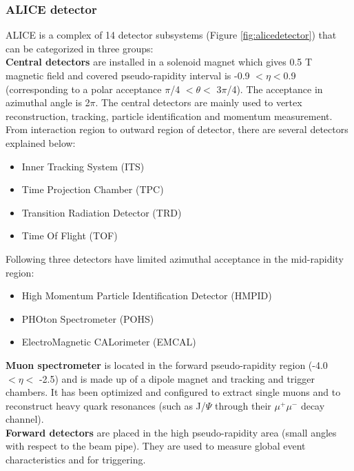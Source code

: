 \subsubsection{ALICE detector}\label{label:alice}
ALICE is a complex of 14 detector subsystems (Figure \ref{fig:alicedetector}) that can be categorized in three groups: \\

\textbf{Central detectors} are installed in a solenoid magnet which gives 0.5 T magnetic field and covered pseudo-rapidity interval is -0.9 $< \eta <$0.9 (corresponding to a polar acceptance $\pi$/4 $< \theta <$ 3$\pi$/4). The acceptance in azimuthal angle is 2$\pi$. The central detectors are mainly used to vertex reconstruction, tracking, particle identification and momentum measurement. From interaction region to outward region of detector, there are several detectors explained below:



\begin{itemize}
\item Inner Tracking System (ITS)
\item Time Projection Chamber (TPC)
\item Transition Radiation Detector (TRD)
\item Time Of Flight (TOF)
\end{itemize}

Following three detectors have limited azimuthal acceptance in the  mid-rapidity region:

\begin{itemize}
\item High Momentum Particle Identification Detector (HMPID)
\item PHOton Spectrometer (POHS)
\item ElectroMagnetic CALorimeter (EMCAL)
\end{itemize}


\textbf{Muon spectrometer} is located in the forward pseudo-rapidity region (-4.0 $< \eta <$ -2.5) and is made up of a dipole magnet and tracking and trigger chambers. It has been optimized and configured to extract single muons and to reconstruct heavy quark resonances (such as J/$\Psi$ through their $\mu^{+}\mu^{-}$ decay channel). \\

\textbf{Forward detectors} are placed in the high pseudo-rapidity area (small angles with respect to the beam pipe). They are used to measure global event characteristics and for triggering.

